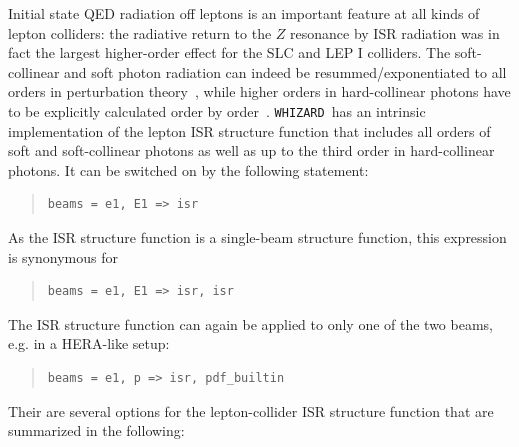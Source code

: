 \documentclass[12pt]{book}
\newcommand{\ttt}[1]{\texttt{#1}}
\newcommand{\whizard}{\ttt{WHIZARD}}
\begin{document}
Initial state QED radiation off leptons is an important feature at all
kinds of lepton colliders: the radiative return to the $Z$ resonance
by ISR radiation was in fact the largest higher-order effect for the
SLC and LEP I colliders. The soft-collinear and soft photon radiation
can indeed be resummed/exponentiated to all orders in perturbation
theory~\cite{Gribov:1972rt}, while higher orders in hard-collinear
photons have to be explicitly calculated order by
order~\cite{Kuraev:1985hb,Skrzypek:1990qs}. \whizard\ has an intrinsic
implementation of the lepton ISR structure function that includes all
orders of soft and soft-collinear photons as well as up to the third
order in hard-collinear photons. It can be switched on by the
following statement:
\begin{quote}
\begin{footnotesize}
\begin{Verbatim}
beams = e1, E1 => isr
\end{Verbatim}
\end{footnotesize}
\end{quote}
As the ISR structure function is a single-beam structure function,
this expression is synonymous for
\begin{quote}
\begin{footnotesize}
\begin{Verbatim}
beams = e1, E1 => isr, isr
\end{Verbatim}
\end{footnotesize}
\end{quote}
The ISR structure function can again be applied to only one of the two
beams, e.g. in a HERA-like setup:
\begin{quote}
\begin{footnotesize}
\begin{Verbatim}
beams = e1, p => isr, pdf_builtin
\end{Verbatim}
\end{footnotesize}
\end{quote}

Their are several options for the lepton-collider ISR structure
function that are summarized in the following:

\vspace{2mm}
\end{document}
